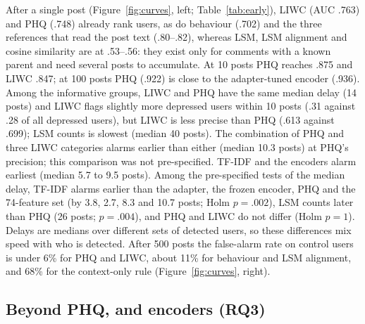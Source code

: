 \documentclass[11pt]{article}
\begin{document}
After a single post (Figure~\ref{fig:curves}, left; Table~\ref{tab:early}), LIWC (AUC .763) and PHQ (.748) already rank users, as do behaviour (.702) and the three references that read the post text (.80--.82), whereas LSM, LSM alignment and cosine similarity are at .53--.56: they exist only for comments with a known parent and need several posts to accumulate.
At 10 posts PHQ reaches .875 and LIWC .847; at 100 posts PHQ (.922) is close to the adapter-tuned encoder (.936).
Among the informative groups, LIWC and PHQ have the same median delay (14 posts) and LIWC flags slightly more depressed users within 10 posts (.31 against .28 of all depressed users), but LIWC is less precise than PHQ (.613 against .699); LSM counts is slowest (median 40 posts).
The combination of PHQ and three LIWC categories alarms earlier than either (median 10.3 posts) at PHQ's precision; this comparison was not pre-specified.
TF-IDF and the encoders alarm earliest (median 5.7 to 9.5 posts).
Among the pre-specified tests of the median delay, TF-IDF alarms earlier than the adapter, the frozen encoder, PHQ and the 74-feature set (by 3.8, 2.7, 8.3 and 10.7 posts; Holm $p=.002$), LSM counts later than PHQ (26 posts; $p=.004$), and PHQ and LIWC do not differ (Holm $p=1$).
Delays are medians over different sets of detected users, so these differences mix speed with who is detected.
After 500 posts the false-alarm rate on control users is under 6\% for PHQ and LIWC, about 11\% for behaviour and LSM alignment, and 68\% for the context-only rule (Figure~\ref{fig:curves}, right).

\subsection{Beyond PHQ, and encoders (RQ3)}

\begin{table}[t]
\centering\scriptsize\setlength{\tabcolsep}{3pt}
\resizebox{\columnwidth}{!}{}
\caption{Key paired differences (mean over repeats; Holm-adjusted $p$ in parentheses; .004 and .002 are the smallest attainable values). 74 feat.: PHQ + 3 LIWC + LSM alignment. All 22 comparisons are in Appendix~\ref{app:pairs}.}
\label{tab:key}
\end{table}
\end{document}
